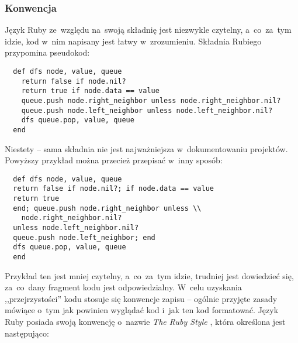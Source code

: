 \subsubsection{Konwencja} \label{dokumentacja.konwencja}

Język Ruby ze~względu na~swoją składnię jest niezwykle czytelny, a~co~za~tym idzie, kod w~nim napisany jest łatwy w~zrozumieniu. Składnia Rubiego przypomina pseudokod:

   \label{code.simpleruby}
  \begin{lstlisting}
  def dfs node, value, queue
    return false if node.nil?
    return true if node.data == value
    queue.push node.right_neighbor unless node.right_neighbor.nil?
    queue.push node.left_neighbor unless node.left_neighbor.nil?
    dfs queue.pop, value, queue
  end
  \end{lstlisting}

Niestety -- sama składnia nie jest najważniejsza w~dokumentowaniu projektów. Powyższy przykład można przecież przepisać w~inny sposób:

  \begin{lstlisting}
  def dfs node, value, queue
  return false if node.nil?; if node.data == value
  return true
  end; queue.push node.right_neighbor unless \\
    node.right_neighbor.nil?
  unless node.left_neighbor.nil?
  queue.push node.left_neighbor; end
  dfs queue.pop, value, queue
  end
  \end{lstlisting}

Przykład ten jest mniej czytelny, a~co~za~tym idzie, trudniej jest dowiedzieć się, za~co~dany fragment kodu jest odpowiedzialny. W~celu uzyskania ,,przejrzystości'' kodu stosuje się konwencje zapisu -- ogólnie przyjęte zasady mówiące o~tym jak powinien wyglądać kod i~jak ten kod formatować. Język Ruby posiada swoją konwencję o~nazwie \textit{The Ruby Style} \cite{therubyway}, która określona jest następująco:

